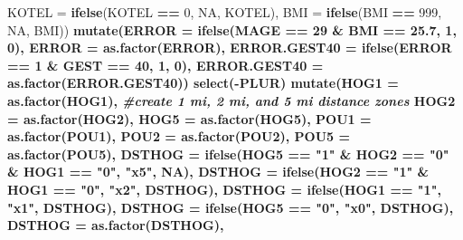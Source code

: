 \documentclass[
  12pt,
]{article}
\newenvironment{Shaded}{\begin{snugshade}}{\end{snugshade}}
\newcommand{\CommentTok}[1]{\textcolor[rgb]{0.56,0.35,0.01}{\textit{#1}}}
\newcommand{\DataTypeTok}[1]{\textcolor[rgb]{0.13,0.29,0.53}{#1}}
\newcommand{\DecValTok}[1]{\textcolor[rgb]{0.00,0.00,0.81}{#1}}
\newcommand{\FloatTok}[1]{\textcolor[rgb]{0.00,0.00,0.81}{#1}}
\newcommand{\KeywordTok}[1]{\textcolor[rgb]{0.13,0.29,0.53}{\textbf{#1}}}
\newcommand{\NormalTok}[1]{#1}
\newcommand{\OperatorTok}[1]{\textcolor[rgb]{0.81,0.36,0.00}{\textbf{#1}}}
\newcommand{\OtherTok}[1]{\textcolor[rgb]{0.56,0.35,0.01}{#1}}
\newcommand{\StringTok}[1]{\textcolor[rgb]{0.31,0.60,0.02}{#1}}
\begin{document}
\begin{Shaded}
\begin{Highlighting}[]
{{{{{         \DataTypeTok{KOTEL =} \KeywordTok{ifelse}\NormalTok{(KOTEL }\OperatorTok{==}\StringTok{ }\DecValTok{0}\NormalTok{, }\OtherTok{NA}\NormalTok{, KOTEL),}
         \DataTypeTok{BMI =} \KeywordTok{ifelse}\NormalTok{(BMI }\OperatorTok{==}\StringTok{ }\DecValTok{999}\NormalTok{, }\OtherTok{NA}\NormalTok{, BMI)) }\OperatorTok{%
\StringTok{  }\KeywordTok{mutate}\NormalTok{(}\DataTypeTok{ERROR =} \KeywordTok{ifelse}\NormalTok{(MAGE }\OperatorTok{==}\StringTok{ }\DecValTok{29} \OperatorTok{&}\StringTok{ }\NormalTok{BMI }\OperatorTok{==}\StringTok{ }\FloatTok{25.7}\NormalTok{, }\DecValTok{1}\NormalTok{, }\DecValTok{0}\NormalTok{),}
         \DataTypeTok{ERROR =} \KeywordTok{as.factor}\NormalTok{(ERROR),}
         \DataTypeTok{ERROR.GEST40 =} \KeywordTok{ifelse}\NormalTok{(ERROR }\OperatorTok{==}\StringTok{ }\DecValTok{1} \OperatorTok{&}\StringTok{ }\NormalTok{GEST }\OperatorTok{==}\StringTok{ }\DecValTok{40}\NormalTok{, }\DecValTok{1}\NormalTok{, }\DecValTok{0}\NormalTok{),}
         \DataTypeTok{ERROR.GEST40 =} \KeywordTok{as.factor}\NormalTok{(ERROR.GEST40)) }\OperatorTok{%
\StringTok{  }\KeywordTok{select}\NormalTok{(}\OperatorTok{-}\NormalTok{PLUR) }\OperatorTok{%
\StringTok{  }\KeywordTok{mutate}\NormalTok{(}\DataTypeTok{HOG1 =} \KeywordTok{as.factor}\NormalTok{(HOG1), }\CommentTok{#create 1 mi, 2 mi, and 5 mi distance zones }
         \DataTypeTok{HOG2 =} \KeywordTok{as.factor}\NormalTok{(HOG2),}
         \DataTypeTok{HOG5 =} \KeywordTok{as.factor}\NormalTok{(HOG5),}
         \DataTypeTok{POU1 =} \KeywordTok{as.factor}\NormalTok{(POU1), }
         \DataTypeTok{POU2 =} \KeywordTok{as.factor}\NormalTok{(POU2),}
         \DataTypeTok{POU5 =} \KeywordTok{as.factor}\NormalTok{(POU5),}
         \DataTypeTok{DSTHOG =} \KeywordTok{ifelse}\NormalTok{(HOG5 }\OperatorTok{==}\StringTok{ "1"} \OperatorTok{&}\StringTok{ }\NormalTok{HOG2 }\OperatorTok{==}\StringTok{ "0"} \OperatorTok{&}\StringTok{ }\NormalTok{HOG1 }\OperatorTok{==}\StringTok{ "0"}\NormalTok{, }\StringTok{"x5"}\NormalTok{, }\OtherTok{NA}\NormalTok{),}
         \DataTypeTok{DSTHOG =} \KeywordTok{ifelse}\NormalTok{(HOG2 }\OperatorTok{==}\StringTok{ "1"} \OperatorTok{&}\StringTok{ }\NormalTok{HOG1 }\OperatorTok{==}\StringTok{ "0"}\NormalTok{, }\StringTok{"x2"}\NormalTok{, DSTHOG),}
         \DataTypeTok{DSTHOG =} \KeywordTok{ifelse}\NormalTok{(HOG1 }\OperatorTok{==}\StringTok{ "1"}\NormalTok{, }\StringTok{"x1"}\NormalTok{, DSTHOG),}
         \DataTypeTok{DSTHOG =} \KeywordTok{ifelse}\NormalTok{(HOG5 }\OperatorTok{==}\StringTok{ "0"}\NormalTok{, }\StringTok{"x0"}\NormalTok{, DSTHOG),}
         \DataTypeTok{DSTHOG =} \KeywordTok{as.factor}\NormalTok{(DSTHOG),}
}}}}}}}}
\end{Highlighting}
\end{Shaded}
\end{document}
